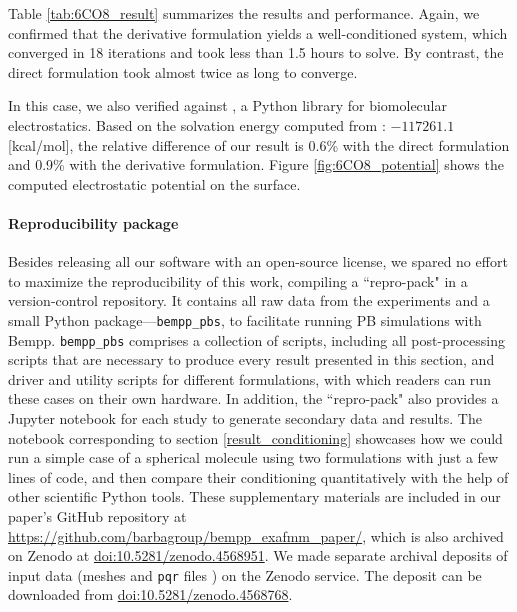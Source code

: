 Table \ref{tab:6CO8_result} summarizes the results and performance.
Again, we confirmed that the derivative formulation yields a well-conditioned system, which converged in 18 iterations and took less than 1.5 hours to solve.
By contrast, the direct formulation took almost twice as long to converge.

In this case, we also verified against \pygbe \cite{cooper2016pygbe}, a Python \bem library for biomolecular electrostatics.
Based on the solvation energy computed from \pygbe: $-117261.1$ [kcal/mol], the relative difference of our result is 0.6\% with the direct formulation and 0.9\% with the derivative formulation.
Figure \ref{fig:6CO8_potential} shows the computed electrostatic potential on the surface.

\paragraph{Reproducibility package}

Besides releasing all our software with an open-source license, we spared no effort to maximize the reproducibility of this work, compiling a ``repro-pack" in a version-control repository.
It contains all raw data from the experiments and a small Python package---\texttt{bempp\_pbs}, to facilitate running PB simulations with Bempp.
\texttt{bempp\_pbs} comprises a collection of scripts, including all post-processing scripts that are necessary to produce every result presented in this section, and driver and utility scripts for different formulations, with which readers can run these cases on their own hardware.
In addition, the ``repro-pack" also provides a Jupyter notebook for each study to generate secondary data and results.
The notebook corresponding to section \ref{result_conditioning} showcases how we could run a simple case of a spherical molecule using two formulations with just a few lines of code, and then compare their conditioning quantitatively with the help of other scientific Python tools.
These supplementary materials are included in our paper's GitHub repository at \href{https://github.com/barbagroup/bempp\_exafmm\_paper/}{https://github.com/barbagroup/bempp\_exafmm\_paper/}, which is also archived on Zenodo at \href{http://doi.org/10.5281/zenodo.4568951}{doi:10.5281/zenodo.4568951}.
We made separate archival deposits of input data (meshes and \texttt{pqr} files ) on the Zenodo service.
The deposit can be downloaded from \href{http://doi.org/10.5281/zenodo.4568768}{doi:10.5281/zenodo.4568768}.
